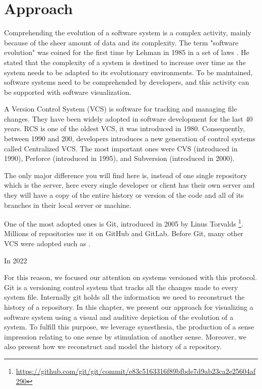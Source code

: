 
\chapter[Approach]{Approach}
\graphicspath{ {images/approach} }

Comprehending the evolution of a software system is a complex activity, mainly because of the sheer amount of data and its complexity. 
The term "software evolution" was coined for the first time by Lehman in 1985 in a set of laws \cite{Lehman1985}.
He stated that the complexity of a system is destined to increase over time as the system needs to be adapted to its evolutionary environments. 
To be maintained, software systems need to be comprehended by developers, and this activity can be supported with software visualization. 



A Version Control System (VCS) is software for tracking and managing file changes. They have been widely adopted in software development for the last 40 years. RCS is one of the oldest VCS, it was introduced in 1980. Consequently, between 1990 and 200, developers introduces a new generation of control systems called Centralized VCS. The most important ones were CVS (introduced in 1990), Perforce (introduced in 1995), and Subversion (introduced in 2000). 


The only major difference you will find here is, instead of one single repository which is the server, here every single developer or client has their own server and they will have a copy of the entire history or version of the code and all of its branches in their local server or machine.


One of the most adopted ones is Git, introduced in 2005 by Linus Torvalds \footnote{\url{https://github.com/git/git/commit/e83c5163316f89bfbde7d9ab23ca2e25604af290}}. Millions of repositories use it on GitHub and GitLab. Before Git, many other VCS were adopted such as 
. 

In 2022 

For this reason, we focused our attention on systems versioned with this protocol.
Git is a versioning control system that tracks all the changes made to every system file. 
Internally git holds all the information we need to reconstruct the history of a repository. 
In this chapter, we present our approach for visualizing a software system using a visual and auditive depiction of the evolution of a system. 
To fulfill this purpose, we leverage synesthesia, the production of a sense impression relating to one sense by stimulation of another sense.
Moreover, we also present how we reconstruct and model the history of a repository. 

